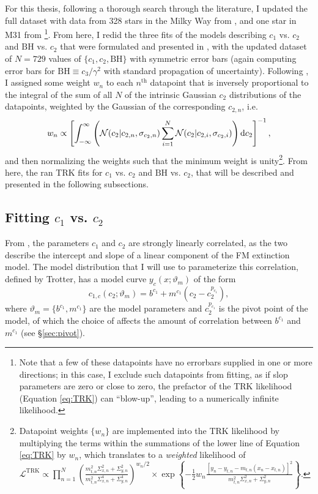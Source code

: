 For this thesis, following a thorough search through the literature, I updated the full dataset with data from 328 stars in the Milky Way from \textcite{newdatafitzpatrick2007analysis}, and one star in M31 from \textcite{m31dataclayton2015new}\footnote{Note that a few of these datapoints have no errorbars supplied in one or more directions; in this case, I exclude such datapoints from fitting, as if slop parameters are zero or close to zero, the prefactor of the TRK likelihood (Equation \eqref{eq:TRK}) can ``blow-up'', leading to a numerically infinite likelihood.}. From here, I redid the three fits of the models describing $c_1$ vs. $c_2$ and $\text{BH}$ vs. $c_2$ that were formulated and presented in \textcite{trotter}, with the updated dataset of $N=729$ values of $\{c_1, c_2, \text{BH}\}$ with symmetric error bars (again computing error bars for $\text{BH}\equiv c_3/\gamma^2$ with standard propagation of uncertainty). Following \textcite{trotter}, I assigned some weight $w_n$ to each $n^\text{th}$ datapoint that is inversely proportional to the integral of the sum of all $N$ of the intrinsic Gaussian $c_2$ distributions of the datapoints, weighted by the Gaussian of the corresponding $c_{2,n}$, i.e.
\begin{equation}\label{eq:c2weight}
w_n\propto\left[\int_{-\infty}^\infty\left(\mathcal{N}(c_2|c_{2,n},\sigma_{c_2,n})\sum\limits_{i=1}^N\mathcal{N}(c_2|c_{2,i},\sigma_{c_2,i})\right)\mathop{}\!\mathrm{d} c_2\right]^{-1},
\end{equation}
and then normalizing the weights such that the minimum weight is unity\footnote{\label{footnote:weighting}Datapoint weights $\{w_n\}$ are implemented into the TRK likelihood by multiplying the terms within the summations of the lower line of Equation \eqref{eq:TRK} by $w_n$, which translates to a \textit{weighted} likelihood of 
$\displaystyle\mathcal{L}^{\mathrm {TRK}} \propto \prod_{n=1}^{N}{ \left(\frac{m_{t,n}^2\Sigma_{x,n}^2+\Sigma_{y,n}^2}{m_{t,n}^2\Sigma_{x,n}^4+\Sigma_{y,n}^4}\right)^{\displaystyle w_n/2}\times\exp\left\{{-\frac{1}{2}w_n\frac{\left[y_n-y_{t,n}-m_{t,n}(x_n-x_{t,n})\right]^2}{m_{t,n}^2\Sigma_{x,n}^2+\Sigma_{y,n}^2}}\right\}}$.}. From here, the ran TRK fits for $c_1$ vs. $c_2$ and $\text{BH}$ vs. $c_2$, that will be described and presented in the following subsections.

\subsection{Fitting $c_1$ vs. $c_2$}
From \textcite{trotter}, the parameters $c_1$ and $c_2$ are strongly linearly correlated, as the two describe the intercept and slope of a linear component of the FM extinction model. The model distribution that I will use to parameterize this correlation, defined by Trotter, has a model curve $y_c(x;\vartheta_m)$ of the form
\begin{equation}\label{eq:c1c2model}
    c_{1,c}(c_2;\vartheta_m)=b^{c_1}+m^{c_1}\left(c_2 - c_2^{p_{c_1}}\right),
\end{equation}
where $\vartheta_m=\{b^{c_1}, m^{c_1}\}$ are the model parameters and $c_2^{p_{c_1}}$ is the pivot point of the model, of which the choice of affects the amount of correlation between $b^{c_1}$ and $m^{c_1}$ (see \S\ref{sec:pivot}).

